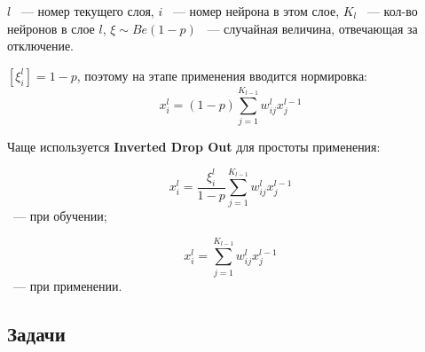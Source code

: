 $l$ ~--- номер текущего слоя, $i$ ~--- номер нейрона в этом слое, $K_l$ ~--- кол-во нейронов в слое $l$, $\xi \sim Be(1-p)$ ~--- случайная величина, отвечающая за отключение.

$\left[\xi_i^l\right] = 1-p$, поэтому на этапе применения вводится нормировка:
$$x_i^l = (1-p) \sum_{j=1}^{K_{l-1}} w_{ij}^l x_j^{l-1} $$

Чаще используется \textbf{Inverted Drop Out} для простоты применения:

$$x_i^l = \frac{\xi_i^l}{1-p} \sum_{j=1}^{K_{l-1}} w_{ij}^l x_j^{l-1} $$
~--- при обучении;

$$x_i^l = \sum_{j=1}^{K_{l-1}} w_{ij}^l x_j^{l-1} $$
~--- при применении.

\subsection{Задачи}
